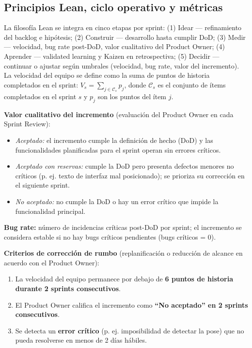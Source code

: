 \documentclass[11pt,a4paper]{article}
\begin{document}
\subsection{Principios Lean, ciclo operativo y métricas}
La filosofía Lean se integra en cinco etapas por sprint: (1) Idear --- refinamiento del backlog e hipótesis; (2) Construir --- desarrollo hasta cumplir DoD; (3) Medir --- velocidad, bug rate post-DoD, valor cualitativo del Product Owner; (4) Aprender --- validated learning y Kaizen en retrospectiva; (5) Decidir --- continuar o ajustar según umbrales (velocidad, bug rate, valor del incremento). La velocidad del equipo se define como la suma de puntos de historia completados en el sprint: $V_s = \sum_{j \in \mathcal{C}_s} p_j$, donde $\mathcal{C}_s$ es el conjunto de ítems completados en el sprint $s$ y $p_j$ son los puntos del ítem $j$.

\textbf{Valor cualitativo del incremento} (evaluación del Product Owner en cada Sprint Review):
\begin{itemize}\setlength{\itemsep}{0.25em}
  \item \textit{Aceptado:} el incremento cumple la definición de hecho (DoD) y las funcionalidades planificadas para el sprint operan sin errores críticos.
  \item \textit{Aceptado con reservas:} cumple la DoD pero presenta defectos menores no críticos (p. ej. texto de interfaz mal posicionado); se prioriza su corrección en el siguiente sprint.
  \item \textit{No aceptado:} no cumple la DoD o hay un error crítico que impide la funcionalidad principal.
\end{itemize}

\textbf{Bug rate:} número de incidencias críticas post-DoD por sprint; el incremento se considera estable si no hay bugs críticos pendientes (bugs críticos = 0).

\textbf{Criterios de corrección de rumbo} (replanificación o reducción de alcance en acuerdo con el Product Owner):
\begin{enumerate}\setlength{\itemsep}{0.25em}
  \item La velocidad del equipo permanece por debajo de \textbf{6 puntos de historia durante 2 sprints consecutivos}.
  \item El Product Owner califica el incremento como \textbf{``No aceptado'' en 2 sprints consecutivos}.
  \item Se detecta un \textbf{error crítico} (p. ej. imposibilidad de detectar la pose) que no pueda resolverse en menos de 2 días hábiles.
\end{enumerate}
\end{document}
